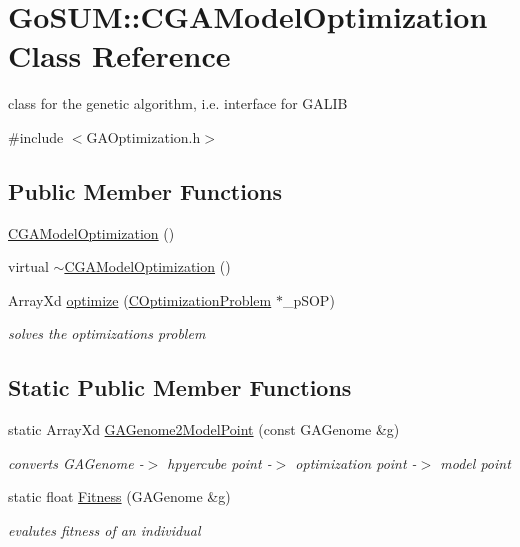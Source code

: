 \hypertarget{class_go_s_u_m_1_1_c_g_a_model_optimization}{\section{Go\-S\-U\-M\-:\-:C\-G\-A\-Model\-Optimization Class Reference}
\label{class_go_s_u_m_1_1_c_g_a_model_optimization}
}


class for the genetic algorithm, i.\-e. interface for G\-A\-L\-I\-B  




{\ttfamily \#include $<$G\-A\-Optimization.\-h$>$}

\subsection*{Public Member Functions}
\begin{DoxyCompactItemize}
\item 
\hyperlink{class_go_s_u_m_1_1_c_g_a_model_optimization_a25077cac206e7a3600bed4b7b857e96f}{C\-G\-A\-Model\-Optimization} ()
\item 
virtual \hyperlink{class_go_s_u_m_1_1_c_g_a_model_optimization_a48088f93cfecaf58bcdf9e41dcb2556c}{$\sim$\-C\-G\-A\-Model\-Optimization} ()
\item 
Array\-Xd \hyperlink{class_go_s_u_m_1_1_c_g_a_model_optimization_a23a9dd1029397334b0bc34f5cf95a4f1}{optimize} (\hyperlink{class_go_s_u_m_1_1_c_optimization_problem}{C\-Optimization\-Problem} $\ast$\-\_\-p\-S\-O\-P)
\begin{DoxyCompactList}\small\item\em solves the optimizations problem \end{DoxyCompactList}\end{DoxyCompactItemize}
\subsection*{Static Public Member Functions}
\begin{DoxyCompactItemize}
\item 
static Array\-Xd \hyperlink{class_go_s_u_m_1_1_c_g_a_model_optimization_a75041b57bc2191d710089e16ad9ed188}{G\-A\-Genome2\-Model\-Point} (const G\-A\-Genome \&g)
\begin{DoxyCompactList}\small\item\em converts G\-A\-Genome -\/$>$ hpyercube point -\/$>$ optimization point -\/$>$ model point \end{DoxyCompactList}\item 
static float \hyperlink{class_go_s_u_m_1_1_c_g_a_model_optimization_ae1c26fbf22cfa62bc316f1761e7e304f}{Fitness} (G\-A\-Genome \&g)
\begin{DoxyCompactList}\small\item\em evalutes fitness of an individual \end{DoxyCompactList}\end{DoxyCompactItemize}
